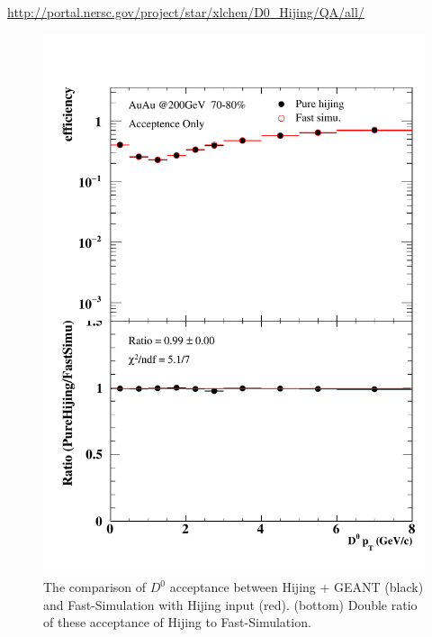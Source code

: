 \url{http://portal.nersc.gov/project/star/xlchen/D0_Hijing/QA/all/}

\begin{figure}[htbp]
\begin{minipage}[htbp]{0.47\linewidth}
\centering
\includegraphics[width=1.0\textwidth,angle=0]{figure/Run14_D0HFT/70_80_0.pdf}
\caption{ The comparison of $D^0$ acceptance between Hijing + GEANT (black) and Fast-Simulation with Hijing input (red). (bottom) Double ratio of these acceptance of Hijing to Fast-Simulation.\label{70_80_0}}
\end{minipage}
\hfill
\begin{minipage}[htbp]{0.47\linewidth}
\centering

\end{minipage}
\end{figure}
